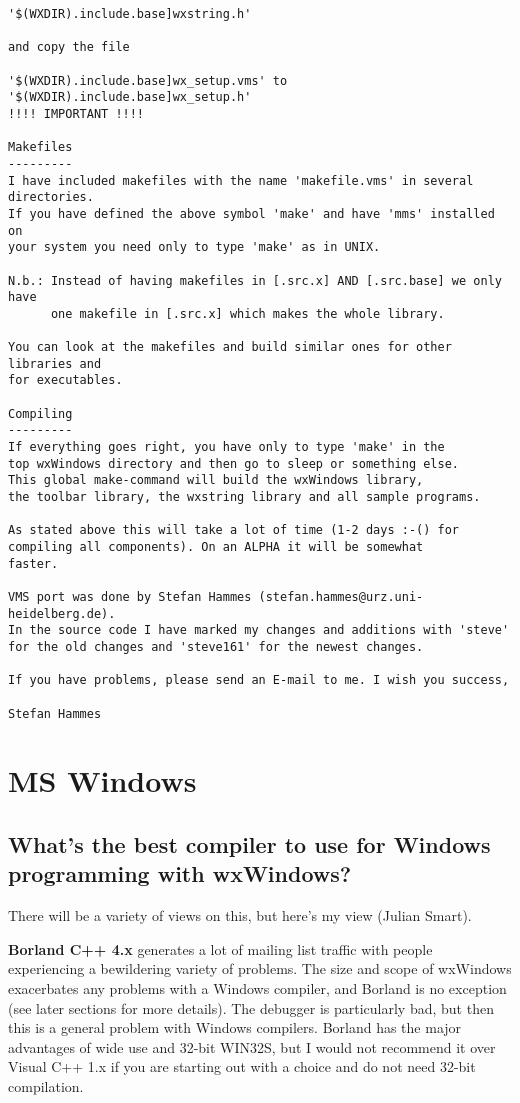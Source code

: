 \begin{verbatim}
'$(WXDIR).include.base]wxstring.h' 

and copy the file 

'$(WXDIR).include.base]wx_setup.vms' to '$(WXDIR).include.base]wx_setup.h'
!!!! IMPORTANT !!!!

Makefiles
---------
I have included makefiles with the name 'makefile.vms' in several directories. 
If you have defined the above symbol 'make' and have 'mms' installed on
your system you need only to type 'make' as in UNIX.

N.b.: Instead of having makefiles in [.src.x] AND [.src.base] we only have
      one makefile in [.src.x] which makes the whole library.

You can look at the makefiles and build similar ones for other libraries and
for executables.

Compiling
---------
If everything goes right, you have only to type 'make' in the 
top wxWindows directory and then go to sleep or something else. 
This global make-command will build the wxWindows library, 
the toolbar library, the wxstring library and all sample programs.

As stated above this will take a lot of time (1-2 days :-() for
compiling all components). On an ALPHA it will be somewhat
faster.

VMS port was done by Stefan Hammes (stefan.hammes@urz.uni-heidelberg.de).
In the source code I have marked my changes and additions with 'steve'
for the old changes and 'steve161' for the newest changes.

If you have problems, please send an E-mail to me. I wish you success,

Stefan Hammes
\end{verbatim}

\section{MS Windows}

\subsection{What's the best compiler to use for Windows programming with wxWindows?}

There will be a variety of views on this, but here's my view (Julian Smart).

{\bf Borland C++ 4.x} generates a lot of mailing list traffic with people experiencing
a bewildering variety of problems. The size and scope of wxWindows exacerbates
any problems with a Windows compiler, and Borland is no exception (see later
sections for more details). The debugger is particularly bad, but then
this is a general problem with Windows compilers. Borland has the major advantages
of wide use and 32-bit WIN32S, but I would not recommend it over Visual C++ 1.x
if you are starting out with a choice and do not need 32-bit compilation.

